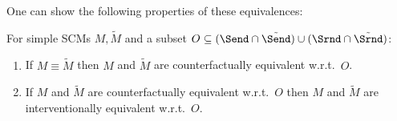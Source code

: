 One can show the following properties of these equivalences:
\begin{Prp}\label{prp:pearls_ladder_levels_2_and_3}
  For simple SCMs $M, \tilde{M}$ and a subset $O \subseteq (\Send \cap \tilde{\Send}) \cup (\Srnd \cap \tilde{\Srnd})$:
  \begin{enumerate}
    \item If $M \equiv \tilde{M}$ then $M$ and $\tilde{M}$ are counterfactually equivalent w.r.t.\ $O$.
    \item If $M$ and $\tilde{M}$ are counterfactually equivalent w.r.t.\ $O$ then 
      $M$ and $\tilde{M}$ are interventionally equivalent w.r.t.\ $O$.
  \end{enumerate}
\end{Prp}

